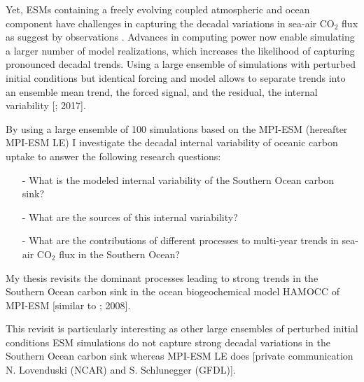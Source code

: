 Yet, \acp{ESM} containing a freely evolving coupled atmospheric and ocean component have challenges in capturing the decadal variations in sea-air CO$_2$ flux as suggest by observations \citep{Wang2016}. Advances in computing power now enable simulating a larger number of model realizations, which increases the likelihood of capturing pronounced decadal trends. Using a large ensemble of simulations with perturbed initial conditions but identical forcing and model allows to separate trends into an ensemble mean trend, the forced signal, and the residual, the internal variability [\cite{McKinley2016}; {\color{RoyalBlue}2017}].\newline

By using a large ensemble of 100 simulations based on the \acs{MPI-ESM} (hereafter \acs{MPI-ESM LE}) I investigate the decadal internal variability of oceanic carbon uptake to answer the following research questions: 
\begin{itemize}
\item[-] What is the modeled internal variability of the Southern Ocean carbon sink? 
\item[-] What are the sources of this internal variability?
\item[-] What are the contributions of different processes to multi-year trends in sea-air CO$_2$ flux in the Southern Ocean?
\end{itemize} 

\vspace{15mm}
My thesis  revisits the dominant processes leading to strong trends in the Southern Ocean carbon sink in the ocean biogeochemical model \acf{HAMOCC} of \acs{MPI-ESM} [similar to \cite{Lovenduski2007}; {\color{RoyalBlue} 2008}].

This revisit is particularly interesting as other large ensembles of perturbed initial conditions \acs{ESM} simulations do not capture strong decadal variations in the Southern Ocean carbon sink whereas \acs{MPI}{\color{RoyalBlue}-ESM LE} does [private communication N. Lovenduski (\acs{NCAR}) and S. Schlunegger (\acs{GFDL})].\newline%

